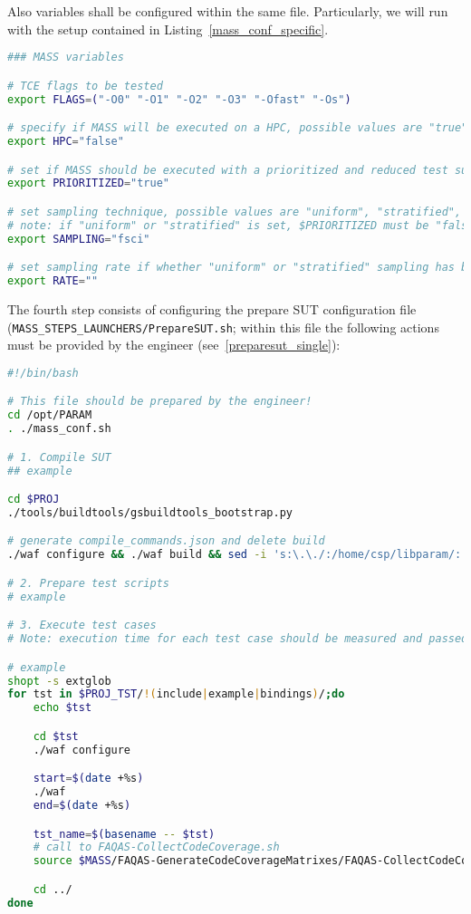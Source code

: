 Also \MASS variables shall be configured within the same file. Particularly, we will run \MASS with the setup contained in Listing~\ref{mass_conf_specific}. 

\begin{lstlisting}[language=bash, label=mass_conf_specific, caption=\MASS specific variables. Excerpt of mass\_conf.sh file.]
### MASS variables

# TCE flags to be tested 
export FLAGS=("-O0" "-O1" "-O2" "-O3" "-Ofast" "-Os")

# specify if MASS will be executed on a HPC, possible values are "true" or "false"
export HPC="false"

# set if MASS should be executed with a prioritized and reduced test suite
export PRIORITIZED="true"

# set sampling technique, possible values are "uniform", "stratified", and "fsci"
# note: if "uniform" or "stratified" is set, $PRIORITIZED must be "false"
export SAMPLING="fsci"

# set sampling rate if whether "uniform" or "stratified" sampling has been selected
export RATE=""
\end{lstlisting}

The fourth step consists of configuring the prepare SUT configuration file \\(\texttt{MASS\_STEPS\_LAUNCHERS/PrepareSUT.sh}; within this file the following actions must be provided by the engineer (see~\ref{preparesut_single}):

\begin{lstlisting}[language=bash, label=preparesut_single, caption=PrepareSUT.sh file.]
#!/bin/bash

# This file should be prepared by the engineer!
cd /opt/PARAM
. ./mass_conf.sh

# 1. Compile SUT
## example

cd $PROJ
./tools/buildtools/gsbuildtools_bootstrap.py

# generate compile_commands.json and delete build
./waf configure && ./waf build && sed -i 's:\.\./:/home/csp/libparam/:' build/compile_commands.json && mv build/compile_commands.json $MUTANTS_DIR

# 2. Prepare test scripts
# example

# 3. Execute test cases
# Note: execution time for each test case should be measured and passed as argument to FAQAS-CollectCodeCoverage.sh

# example
shopt -s extglob
for tst in $PROJ_TST/!(include|example|bindings)/;do
    echo $tst

    cd $tst
    ./waf configure

    start=$(date +%s)
    ./waf
    end=$(date +%s)

    tst_name=$(basename -- $tst)
    # call to FAQAS-CollectCodeCoverage.sh
    source $MASS/FAQAS-GenerateCodeCoverageMatrixes/FAQAS-CollectCodeCoverage.sh $tst_name "$(($end-$start))" $PROJ_TST

    cd ../
done
\end{lstlisting}

